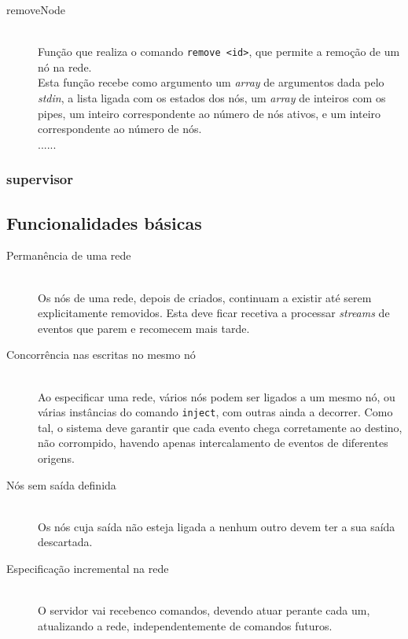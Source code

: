 \documentclass[12pt]{article}
\begin{document}
\begin{description}
\item[removeNode] \hfill \\
Função que realiza o comando \texttt{remove <id>}, que permite a remoção de um nó na rede. 
\\Esta função recebe como argumento um \textit{array} de argumentos dada pelo \textit{stdin}, a lista ligada com os estados dos nós, um \textit{array} de inteiros com os pipes, um inteiro correspondente ao número de nós ativos, e um inteiro correspondente ao número de nós.
\\...... 
\end{description}

\subsubsection{supervisor}


\subsection{Funcionalidades básicas}
\begin{description} 

\item[Permanência de uma rede] \hfill \\
Os nós de uma rede, depois de criados, continuam a existir até serem explicitamente removidos. Esta deve ficar recetiva a processar \textit{streams} de eventos que parem e recomecem mais tarde.

\item[Concorrência nas escritas no mesmo nó] \hfill \\
Ao especificar uma rede, vários nós podem ser ligados a um mesmo nó, ou várias instâncias do comando \texttt{inject}, com outras ainda a decorrer. Como tal, o sistema deve garantir que cada evento chega corretamente ao destino, não corrompido, havendo apenas intercalamento de eventos de diferentes origens.

\item[Nós sem saída definida] \hfill \\
Os nós cuja saída não esteja ligada a nenhum outro devem ter a sua saída descartada.

\item[Especificação incremental na rede] \hfill \\
O servidor vai recebenco comandos, devendo atuar perante cada um, atualizando a rede, independentemente de comandos futuros.

\end{description}
\end{document}
